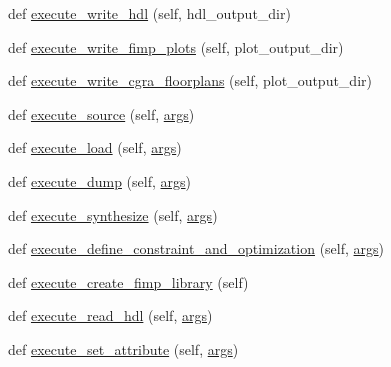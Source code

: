 \begin{DoxyCompactItemize}
\item 
def \hyperlink{classsylva_1_1misc_1_1exec_1_1_s_y_l_v_a_a696ca3640510ccc190d66581f982fb0a}{execute\+\_\+write\+\_\+hdl} (self, hdl\+\_\+output\+\_\+dir)
\item 
def \hyperlink{classsylva_1_1misc_1_1exec_1_1_s_y_l_v_a_a3e0247fc0ddb86e4670ceaa082950e4d}{execute\+\_\+write\+\_\+fimp\+\_\+plots} (self, plot\+\_\+output\+\_\+dir)
\item 
def \hyperlink{classsylva_1_1misc_1_1exec_1_1_s_y_l_v_a_a7de1c85d07263c80c435c01ca33f6f18}{execute\+\_\+write\+\_\+cgra\+\_\+floorplans} (self, plot\+\_\+output\+\_\+dir)
\item 
def \hyperlink{classsylva_1_1misc_1_1exec_1_1_s_y_l_v_a_a6d66a8d4118cd44882b10e31a6486d83}{execute\+\_\+source} (self, \hyperlink{namespacesylva_1_1misc_1_1exec_a4e70593929af3f6aa7fa94d0b4318766}{args})
\item 
def \hyperlink{classsylva_1_1misc_1_1exec_1_1_s_y_l_v_a_ae1fd0355fc0ba1cc2706bc9720347f69}{execute\+\_\+load} (self, \hyperlink{namespacesylva_1_1misc_1_1exec_a4e70593929af3f6aa7fa94d0b4318766}{args})
\item 
def \hyperlink{classsylva_1_1misc_1_1exec_1_1_s_y_l_v_a_a1e3a1bd5990d4d39571805075e3103ba}{execute\+\_\+dump} (self, \hyperlink{namespacesylva_1_1misc_1_1exec_a4e70593929af3f6aa7fa94d0b4318766}{args})
\item 
def \hyperlink{classsylva_1_1misc_1_1exec_1_1_s_y_l_v_a_a5e55481ef1b5394966f32c70c8acb08d}{execute\+\_\+synthesize} (self, \hyperlink{namespacesylva_1_1misc_1_1exec_a4e70593929af3f6aa7fa94d0b4318766}{args})
\item 
def \hyperlink{classsylva_1_1misc_1_1exec_1_1_s_y_l_v_a_a651252c9a7f6009f4c9647abab5d4651}{execute\+\_\+define\+\_\+constraint\+\_\+and\+\_\+optimization} (self, \hyperlink{namespacesylva_1_1misc_1_1exec_a4e70593929af3f6aa7fa94d0b4318766}{args})
\item 
def \hyperlink{classsylva_1_1misc_1_1exec_1_1_s_y_l_v_a_a8a4492e65ade4e43b53de96f2201bc27}{execute\+\_\+create\+\_\+fimp\+\_\+library} (self)
\item 
def \hyperlink{classsylva_1_1misc_1_1exec_1_1_s_y_l_v_a_a6b4351626d411764ca605cdc23158f60}{execute\+\_\+read\+\_\+hdl} (self, \hyperlink{namespacesylva_1_1misc_1_1exec_a4e70593929af3f6aa7fa94d0b4318766}{args})
\item 
def \hyperlink{classsylva_1_1misc_1_1exec_1_1_s_y_l_v_a_a341672492c585c71c0a030e9de2d399a}{execute\+\_\+set\+\_\+attribute} (self, \hyperlink{namespacesylva_1_1misc_1_1exec_a4e70593929af3f6aa7fa94d0b4318766}{args})

\end{DoxyCompactItemize}
